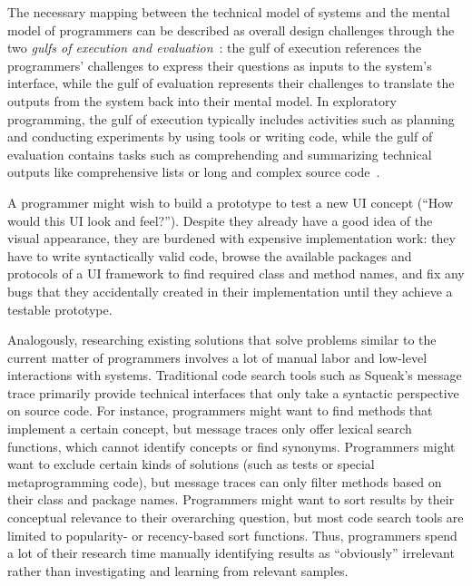 The necessary mapping between the technical model of systems and the mental model of programmers can be described as overall design challenges through the two \emph{gulfs of execution and evaluation}~\cite{norman1986cognitive}:
the gulf of execution references the programmers' challenges to express their questions as inputs to the system's interface, while the gulf of evaluation represents their challenges to translate the outputs from the system back into their mental model.
In exploratory programming, the gulf of execution typically includes activities such as planning and conducting experiments by using tools or writing code, while the gulf of evaluation contains tasks such as comprehending and summarizing technical outputs like comprehensive lists or long and complex source code~\cite{rein2020empirical}.

\begin{example}[5]
	\label{ex:background/challenges}
	A programmer might wish to build a prototype to test a new UI concept (``How would this UI look and feel?'').
	Despite they already have a good idea of the visual appearance, they are burdened with expensive implementation work:
	they have to write syntactically valid code, browse the available packages and protocols of a UI framework to find required class and method names, and fix any bugs that they accidentally created in their implementation until they achieve a testable prototype.

	Analogously, researching existing solutions that solve problems similar to the current matter of programmers involves a lot of manual labor and low-level interactions with systems.
	Traditional code search tools such as Squeak's message trace primarily provide technical interfaces that only take a syntactic perspective on source code.
	For instance, programmers might want to find methods that implement a certain concept, but message traces only offer lexical search functions, which cannot identify concepts or find synonyms.
	Programmers might want to exclude certain kinds of solutions (such as tests or special metaprogramming code), but message traces can only filter methods based on their class and package names.
	Programmers might want to sort results by their conceptual relevance to their overarching question, but most code search tools are limited to popularity- or recency-based sort functions.
	Thus, programmers spend a lot of their research time manually identifying results as ``obviously'' irrelevant rather than investigating and learning from relevant samples.
\end{example}

